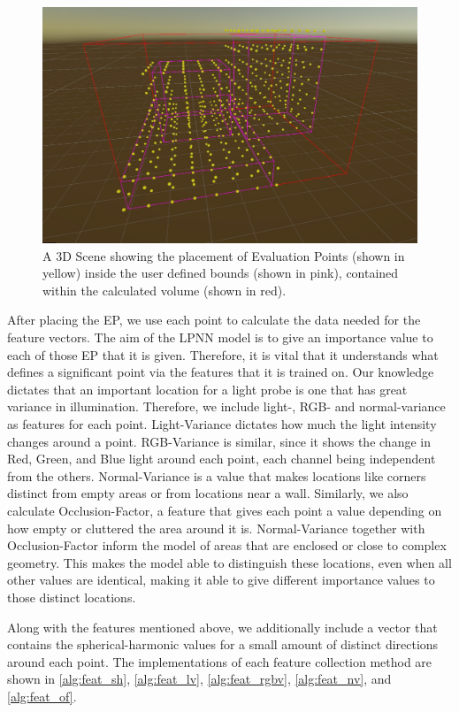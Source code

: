 \begin{figure}[h]
	\centering
	\includegraphics[scale=0.43]{Graphics/Grid_Example.jpg}
	\caption{A 3D Scene showing the placement of Evaluation Points (shown in yellow) inside the user defined bounds (shown in pink), contained within the calculated volume (shown in red).}
	\label{fig:grid}
\end{figure}

After placing the EP, we use each point to calculate the data needed for the feature vectors. The aim of the LPNN model is to give an importance value to each of those EP that it is given. Therefore, it is vital that it understands what defines a significant point via the features that it is trained on. Our knowledge dictates that an important location for a light probe is one that has great variance in illumination. Therefore, we include light-, RGB- and normal-variance as features for each point. Light-Variance dictates how much the light intensity changes around a point. RGB-Variance is similar, since it shows the change in Red, Green, and Blue light around each point, each channel being independent from the others. Normal-Variance is a value that makes locations like corners distinct from empty areas or from locations near a wall. Similarly, we also calculate Occlusion-Factor, a feature that gives each point a value depending on how empty or cluttered the area around it is. Normal-Variance together with Occlusion-Factor inform the model of areas that are enclosed or close to complex geometry. This makes the model able to distinguish these locations, even when all other values are identical, making it able to give different importance values to those distinct locations.

Along with the features mentioned above, we additionally include a vector that contains the spherical-harmonic values for a small amount of distinct directions around each point. The implementations of each feature collection method are shown in \ref{alg:feat_sh}, \ref{alg:feat_lv}, \ref{alg:feat_rgbv}, \ref{alg:feat_nv}, and \ref{alg:feat_of}.


